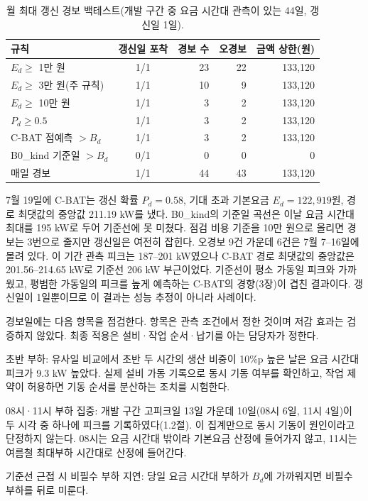 \begin{table}[htbp]
\centering
\hwptablefont
\caption{월 최대 갱신 경보 백테스트(개발 구간 중 요금 시간대 관측이 있는 44일, 갱신일 1일).}\label{tab:ch4-alarm}
\begin{tabular}{lcrrr}
\toprule
규칙 & 갱신일 포착 & 경보 수 & 오경보 & 금액 상한(원) \\
\midrule
$E_d \ge$ 1만 원 & 1/1 & 23 & 22 & 133,120 \\
$E_d \ge$ 3만 원(주 규칙) & 1/1 & 10 & 9 & 133,120 \\
$E_d \ge$ 10만 원 & 1/1 & 3 & 2 & 133,120 \\
$P_d \ge 0.5$ & 1/1 & 3 & 2 & 133,120 \\
C-BAT 점예측 $> B_d$ & 1/1 & 3 & 2 & 133,120 \\
B0\_kind 기준일 $> B_d$ & 0/1 & 0 & 0 & 0 \\
매일 경보 & 1/1 & 44 & 43 & 133,120 \\
\bottomrule
\end{tabular}
\end{table}

7월 19일에 C-BAT는 갱신 확률 $P_d=0.58$, 기대 초과 기본요금 $E_d=122{,}919$원, 경로 최댓값의 중앙값 211.19 kW를 냈다. B0\_kind의 기준일 곡선은 이날 요금 시간대 최대를 195 kW로 두어 기준선에 못 미쳤다. 점검 비용 기준을 10만 원으로 올리면 경보는 3번으로 줄지만 갱신일은 여전히 잡힌다. 오경보 9건 가운데 6건은 7월 7--16일에 몰려 있다. 이 기간 관측 피크는 187--201 kW였으나 C-BAT 경로 최댓값의 중앙값은 201.56--214.65 kW로 기준선 206 kW 부근이었다. 기준선이 평소 가동일 피크와 가까웠고, 평범한 가동일의 피크를 높게 예측하는 C-BAT의 경향(3장)이 겹친 결과이다. 갱신일이 1일뿐이므로 이 결과는 성능 추정이 아니라 사례이다.


경보일에는 다음 항목을 점검한다. 항목은 관측 조건에서 정한 것이며 저감 효과는 검증하지 않았다. 최종 적용은 설비·작업 순서·납기를 아는 담당자가 정한다.
\begin{hwplist}
\item 초반 부하: 유사일 비교에서 초반 두 시간의 생산 비중이 10\%p 높은 날은 요금 시간대 피크가 9.3 kW 높았다. 실제 설비 가동 기록으로 동시 기동 여부를 확인하고, 작업 제약이 허용하면 기동 순서를 분산하는 조치를 시험한다.
\item 08시·11시 부하 집중: 개발 구간 고피크일 13일 가운데 10일(08시 6일, 11시 4일)이 두 시각 중 하나에 피크를 기록하였다(1.2절). 이 집계만으로 동시 기동이 원인이라고 단정하지 않는다. 08시는 요금 시간대 밖이라 기본요금 산정에 들어가지 않고, 11시는 여름철 최대부하 시간대로 산정에 들어간다.
\item 기준선 근접 시 비필수 부하 지연: 당일 요금 시간대 부하가 $B_d$에 가까워지면 비필수 부하를 뒤로 미룬다.
\end{hwplist}

